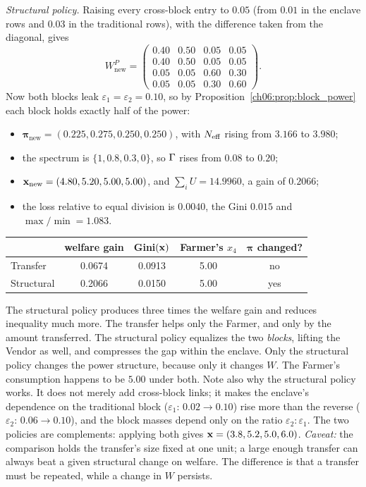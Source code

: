 \documentclass[../solutions_manual.tex]{subfiles}
\begin{document}
 \emph{Structural policy.} Raising every cross-block entry to $0.05$ (from $0.01$ in the enclave rows and $0.03$ in the traditional rows), with the difference taken from the diagonal, gives
\[
W^P_{\text{new}} = \begin{pmatrix} 0.40 & 0.50 & 0.05 & 0.05 \\ 0.40 & 0.50 & 0.05 & 0.05 \\ 0.05 & 0.05 & 0.60 & 0.30 \\ 0.05 & 0.05 & 0.30 & 0.60\end{pmatrix}.
\]
Now both blocks leak $\varepsilon_1 = \varepsilon_2 = 0.10$, so by Proposition~\ref{ch06:prop:block_power} each block holds exactly half of the power:
\begin{itemize}
\item $\boldsymbol{\pi}_{\text{new}} = (0.225, 0.275, 0.250, 0.250)$, with $N_{\text{eff}}$ rising from $3.166$ to $3.980$;
\item the spectrum is $\{1, 0.8, 0.3, 0\}$, so $\Gamma$ rises from $0.08$ to $0.20$;
\item $\mathbf{x}_{\text{new}} = (4.80, 5.20, 5.00, 5.00)$, and $\sum_iU = 14.9960$, a gain of $0.2066$;
\item the loss relative to equal division is $0.0040$, the Gini $0.015$ and $\max/\min = 1.083$.
\end{itemize}

\begin{center}
\begin{tabular}{lcccc}
\toprule
& welfare gain & Gini$(\mathbf{x})$ & Farmer's $x_4$ & $\boldsymbol{\pi}$ changed? \\
\midrule
Transfer & 0.0674 & 0.0913 & 5.00 & no \\
Structural & 0.2066 & 0.0150 & 5.00 & yes \\
\bottomrule
\end{tabular}
\end{center}
The structural policy produces three times the welfare gain and reduces inequality much more. The transfer helps only the Farmer, and only by the amount transferred. The structural policy equalizes the two \emph{blocks}, lifting the Vendor as well, and compresses the gap within the enclave. Only the structural policy changes the power structure, because only it changes $W$. The Farmer's consumption happens to be $5.00$ under both. Note also why the structural policy works. It does not merely add cross-block links; it makes the enclave's dependence on the traditional block ($\varepsilon_1$: $0.02 \to 0.10$) rise more than the reverse ($\varepsilon_2$: $0.06 \to 0.10$), and the block masses depend only on the ratio $\varepsilon_2 : \varepsilon_1$. The two policies are complements: applying both gives $\mathbf{x} = (3.8, 5.2, 5.0, 6.0)$. \emph{Caveat:} the comparison holds the transfer's size fixed at one unit; a large enough transfer can always beat a given structural change on welfare. The difference is that a transfer must be repeated, while a change in $W$ persists.
\end{document}
